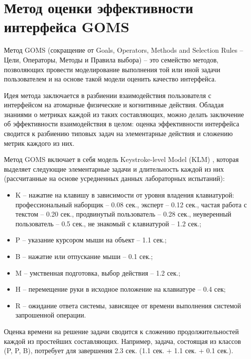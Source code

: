 \section{Метод оценки эффективности интерфейса GOMS}
Метод GOMS (сокращение от Goals, Operators, Methods and Selection Rules -- Цели, Операторы, Методы и Правила выбора) -- это семейство методов, позволяющих провести моделирование выполнения той или иной задачи пользователем и на основе такой модели оценить качество интерфейса.

Идея метода заключается в разбиении взаимодействия пользователя с интерфейсом на атомарные физические и когнитивные действия. Обладая знаниями о метриках каждой из таких составляющих, можно делать заключение об эффективности взаимодействия в целом: оценка
эффективности интерфейса сводится к разбиению типовых задач на элементарные действия и сложению метрик каждого из них.

Метод GOMS включает в себя модель Keystroke-level Model (KLM) \cite{11}, которая выделяет следующие элементарные задачи и длительность каждой из них (рассчитанные на основе усредненных данных лабораторных испытаний):

\begin{itemize}
	\item K – нажатие на клавишу в зависимости от уровня владения клавиатурой: профессиональный	наборщик – 0.08 сек., эксперт – 0.12 сек., частая работа с текстом – 0.20 сек., продвинутый пользователь – 0.28 сек., неуверенный пользователь – 0.5 сек., не знакомый с клавиатурой – 1.2 сек.;
	\item P – указание курсором мыши на объект – 1.1 сек.;
	\item B – нажатие или отпускание мыши – 0.1 сек.;
	\item M – умственная подготовка, выбор действия – 1.2 сек.;
	\item H – перемещение руки в исходное положение на клавиатуре – 0.4 сек;
	\item R – ожидание ответа системы, зависящее от	времени выполнения системой запрошенной операции.
\end{itemize}

Оценка времени на решение задачи сводится к сложению продолжительностей каждой из простейших составляющих. Например, задача, состоящая из классов (P, P, B), потребует для завершения 2.3 сек. (1.1 сек. + 1.1 сек. + 0.1 сек.).

